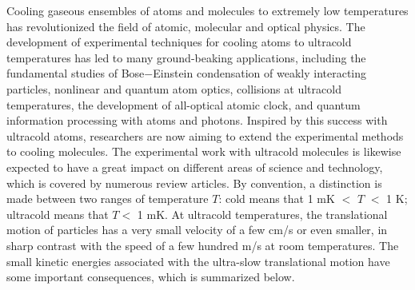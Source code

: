  
Cooling gaseous ensembles of atoms and molecules to extremely low temperatures has revolutionized the 
field of atomic, molecular and optical physics. 
The development of experimental techniques for cooling atoms to ultracold temperatures has led to many ground-beaking applications\cite{southwell2002, chu2002},  
including the fundamental studies of Bose$-$Einstein condensation of weakly interacting particles\cite{anglin2002}, nonlinear and quantum atom 
optics\cite{rolston2002}, collisions at ultracold temperatures\cite{burnett2002}, the development of all-optical atomic
clock\cite{udem2002},
and quantum information processing with atoms and photons\cite{monroe2002}. 
Inspired by this success with 
ultracold atoms, researchers are now aiming to extend the experimental methods to cooling molecules.
The experimental work with ultracold molecules is likewise expected to have  a great
impact on different areas of science and technology, which is covered by numerous review articles\cite{our-njp-review, friedrich2009, schnell2009, Bell2009, krems2010cold, Ni2009,
Jin2011, Jin2012, quemener2012, Baranov2012}. 
By convention, a distinction is made between two ranges of 
temperature $T$: cold means that 1 mK $<$ $T$ $<$ 1 K; ultracold means that $T < $ 1 mK.   
At ultracold temperatures, the translational motion of particles has a very small velocity of a few cm/s or even smaller, in 
sharp contrast with the speed of a few hundred m/s at room temperatures. 
The small kinetic energies associated with the ultra-slow translational motion have some important consequences, which is summarized below.

